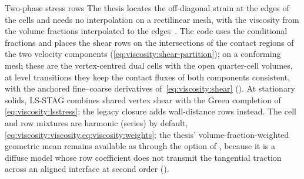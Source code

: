 \begin{deviation}{Two-phase stress rows}\label{dev:viscosity:stress}
The thesis locates the off-diagonal strain at the edges of the cells and
needs no interpolation on a rectilinear mesh, with the viscosity from the
volume fractions interpolated to the edges~. The
code uses the conditional fractions and places the shear rows on the
intersections of the contact regions of the two velocity components
(\cref{eq:viscosity:shear-partition}); on a conforming mesh these are the
vertex-centred dual cells with the open quarter-cell volumes, at level
transitions they keep the contact fluxes of both components consistent,
with the anchored fine--coarse derivatives of~\cref{eq:viscosity:shear}
(). At stationary solids, LS-STAG combines shared vertex shear
with the Green completion of \cref{eq:viscosity:lsstress}; the legacy closure
adds wall-distance rows instead. The cell and row mixtures are harmonic (series) by default,
\cref{eq:viscosity:viscosity,eq:viscosity:weights}; the thesis'
volume-fraction-weighted geometric mean remains available as
 through the 
option of , because it is a diffuse model whose
row coefficient does not transmit the tangential traction across an aligned
interface at second order ().
\end{deviation}

